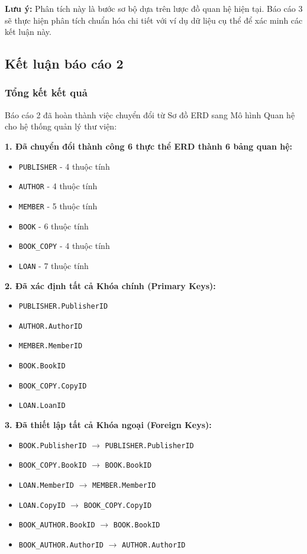 \documentclass[12pt,a4paper]{article}
\begin{document}
\textbf{Lưu ý:} Phân tích này là bước sơ bộ dựa trên lược đồ quan hệ hiện tại. Báo cáo 3 sẽ thực hiện phân tích chuẩn hóa chi tiết với ví dụ dữ liệu cụ thể để xác minh các kết luận này.

\subsection{Kết luận báo cáo 2}

\subsubsection{Tổng kết kết quả}

Báo cáo 2 đã hoàn thành việc chuyển đổi từ Sơ đồ ERD sang Mô hình Quan hệ cho hệ thống quản lý thư viện:

\textbf{1. Đã chuyển đổi thành công 6 thực thể ERD thành 6 bảng quan hệ:}
\begin{itemize}
    \item \texttt{PUBLISHER} - 4 thuộc tính
    \item \texttt{AUTHOR} - 4 thuộc tính
    \item \texttt{MEMBER} - 5 thuộc tính
    \item \texttt{BOOK} - 6 thuộc tính
    \item \texttt{BOOK\_COPY} - 4 thuộc tính
    \item \texttt{LOAN} - 7 thuộc tính
\end{itemize}

\textbf{2. Đã xác định tất cả Khóa chính (Primary Keys):}
\begin{itemize}
    \item \texttt{PUBLISHER.PublisherID}
    \item \texttt{AUTHOR.AuthorID}
    \item \texttt{MEMBER.MemberID}
    \item \texttt{BOOK.BookID}
    \item \texttt{BOOK\_COPY.CopyID}
    \item \texttt{LOAN.LoanID}
\end{itemize}

\textbf{3. Đã thiết lập tất cả Khóa ngoại (Foreign Keys):}
\begin{itemize}
    \item \texttt{BOOK.PublisherID} $\rightarrow$ \texttt{PUBLISHER.PublisherID}
    \item \texttt{BOOK\_COPY.BookID} $\rightarrow$ \texttt{BOOK.BookID}
    \item \texttt{LOAN.MemberID} $\rightarrow$ \texttt{MEMBER.MemberID}
    \item \texttt{LOAN.CopyID} $\rightarrow$ \texttt{BOOK\_COPY.CopyID}
    \item \texttt{BOOK\_AUTHOR.BookID} $\rightarrow$ \texttt{BOOK.BookID}
    \item \texttt{BOOK\_AUTHOR.AuthorID} $\rightarrow$ \texttt{AUTHOR.AuthorID}
\end{itemize}
\end{document}
